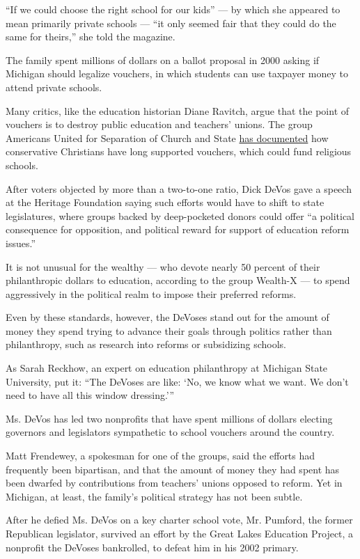 ``If we could choose the right school for our kids'' --- by which she
appeared to mean primarily private schools --- ``it only seemed fair
that they could do the same for theirs,'' she told the magazine.

The family spent millions of dollars on a ballot proposal in 2000 asking
if Michigan should legalize vouchers, in which students can use taxpayer
money to attend private schools.

Many critics, like the education historian Diane Ravitch, argue that the
point of vouchers is to destroy public education and teachers' unions.
The group Americans United for Separation of Church and State
\href{http://www.au.org/church-state/september-2010-church-state/featured/sneak-attack}{has
documented} how conservative Christians have long supported vouchers,
which could fund religious schools.

After voters objected by more than a two-to-one ratio, Dick DeVos gave a
speech at the Heritage Foundation saying such efforts would have to
shift to state legislatures, where groups backed by deep-pocketed donors
could offer ``a political consequence for opposition, and political
reward for support of education reform issues.''

It is not unusual for the wealthy --- who devote nearly 50 percent of
their philanthropic dollars to education, according to the group
Wealth-X --- to spend aggressively in the political realm to impose
their preferred reforms.

Even by these standards, however, the DeVoses stand out for the amount
of money they spend trying to advance their goals through politics
rather than philanthropy, such as research into reforms or subsidizing
schools.

As Sarah Reckhow, an expert on education philanthropy at Michigan State
University, put it: ``The DeVoses are like: `No, we know what we want.
We don't need to have all this window dressing.'''

Ms. DeVos has led two nonprofits that have spent millions of dollars
electing governors and legislators sympathetic to school vouchers around
the country.

Matt Frendewey, a spokesman for one of the groups, said the efforts had
frequently been bipartisan, and that the amount of money they had spent
has been dwarfed by contributions from teachers' unions opposed to
reform. Yet in Michigan, at least, the family's political strategy has
not been subtle.

After he defied Ms. DeVos on a key charter school vote, Mr. Pumford, the
former Republican legislator, survived an effort by the Great Lakes
Education Project, a nonprofit the DeVoses bankrolled, to defeat him in
his 2002 primary.

